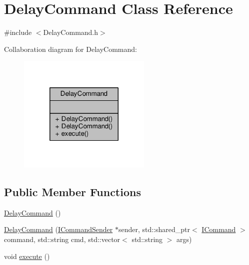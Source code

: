\hypertarget{class_delay_command}{\section{Delay\-Command Class Reference}
\label{class_delay_command}
}


{\ttfamily \#include $<$Delay\-Command.\-h$>$}



Collaboration diagram for Delay\-Command\-:
\nopagebreak
\begin{figure}[H]
\begin{center}
\leavevmode
\includegraphics[width=180pt]{class_delay_command__coll__graph}
\end{center}
\end{figure}
\subsection*{Public Member Functions}
\begin{DoxyCompactItemize}
\item 
\hyperlink{class_delay_command_ac0030734b821fc3b6b788248b0b8be48}{Delay\-Command} ()
\item 
\hyperlink{class_delay_command_ae8b70c2fb5e2c7586c39337cef18ebf9}{Delay\-Command} (\hyperlink{class_i_command_sender}{I\-Command\-Sender} $\ast$sender, std\-::shared\-\_\-ptr$<$ \hyperlink{class_i_command}{I\-Command} $>$ command, std\-::string cmd, std\-::vector$<$ std\-::string $>$ args)
\item 
void \hyperlink{class_delay_command_aab05b5601b95c0de34889a597bb7e4a0}{execute} ()
\end{DoxyCompactItemize}


